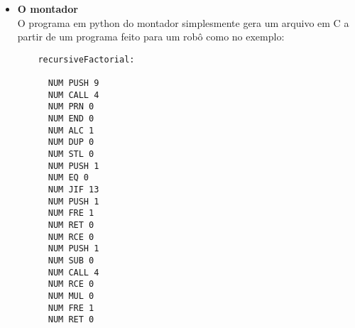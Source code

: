 \documentclass{article}
\begin{document}
\begin{itemize}
\begin{lstlisting}
          	if(size > 100-arena->firstFree) {
          		printf("The Arena is full.\n");
          		return;
          	}
          	
        	for(int i = arena->firstFree; i < size + arena->firstFree; i++){
        		Maquina *robo;
        		robo = cria_maquina(p);
        		
        		robo->t = team;
        		arena->exercitos[i] = robo;
        		robo->crystals = 0;
        		robo->alive = True;
        		robo->x = 1;
        		robo->y = 0;
        		
        	}
        	arena->firstFree += size;
        	
        }
    \end{lstlisting}
    
    Decidimos por destruir um grupo de rob\^os utilizando o time que ele pertence.
    \begin{lstlisting}
    void removeExercito(Arena *arena, Time t) {
    
    	for(int i = 0; i < arena->firstFree; i++) {
    		if(arena->exercitos[i] != NULL && arena->exercitos[i]->t == t) {
    			arena->exercitos[i] = NULL;
    		}
    	}
    
    
    	arena->firstFree = tapaBuraco(arena->exercitos, arena->firstFree);
    }	
    \end{lstlisting}
    A fun\c c\~ao \textit{tapaBuraco} foi essencial para a solu\c c\~ao de bugs e para a atualiza\c c\~ao da primeia posi\c c\~ao livre do vetor de m\'aquinas. Ela funciona similarmente \`a fun\c c\~ao \textit{partition} do \textit{quicksort} que, dado um piv\^o, separa todos os elementos do vetor em maiores que o piv\^o e menores que ele. Neste caso, separamos todos os ponteiros \textbf{NULL} pra m\'aquina daqueles que n\~ao o s\~ao
    
    \item \textbf{O montador} \\
    O programa em python do montador simplesmente gera um arquivo em C a partir de um programa feito para um rob\^o como no exemplo:
    \begin{lstlisting}
    recursiveFactorial:
    
      NUM PUSH 9 
      NUM CALL 4
      NUM PRN 0
      NUM END 0
      NUM ALC 1
      NUM DUP 0
      NUM STL 0
      NUM PUSH 1
      NUM EQ 0
      NUM JIF 13
      NUM PUSH 1
      NUM FRE 1
      NUM RET 0
      NUM RCE 0
      NUM PUSH 1
      NUM SUB 0
      NUM CALL 4
      NUM RCE 0
      NUM MUL 0
      NUM FRE 1
      NUM RET 0
    \end{lstlisting}
    

\end{itemize}
\end{document}
